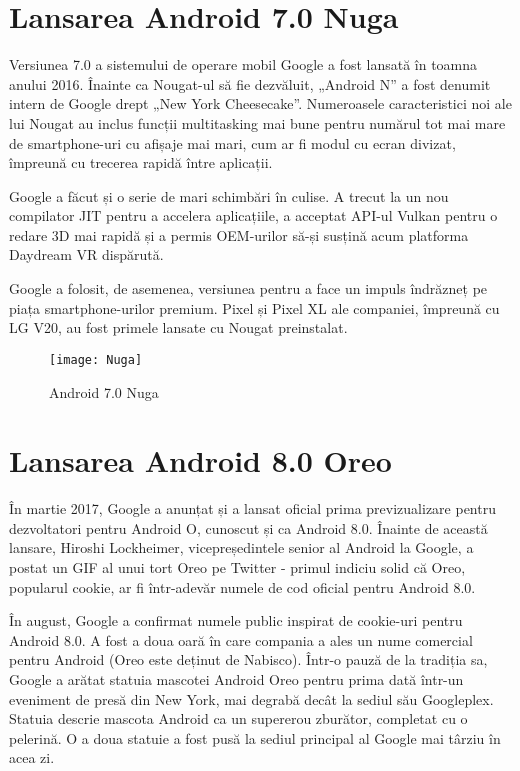 \documentclass[a4paper,12pt]{amsbook}
\begin{document}
\chapter{\Large Lansarea Android 7.0 Nuga}
\par
Versiunea 7.0 a sistemului de operare mobil Google a fost lansată în toamna anului 2016. Înainte ca Nougat-ul să fie dezvăluit, „Android N” a fost denumit intern de Google drept „New York Cheesecake”. Numeroasele caracteristici noi ale lui Nougat au inclus funcții multitasking mai bune pentru numărul tot mai mare de smartphone-uri cu afișaje mai mari, cum ar fi modul cu ecran divizat, împreună cu trecerea rapidă între aplicații.

Google a făcut și o serie de mari schimbări în culise. A trecut la un nou compilator JIT pentru a accelera aplicațiile, a acceptat API-ul Vulkan pentru o redare 3D mai rapidă și a permis OEM-urilor să-și susțină acum platforma Daydream VR dispărută.

Google a folosit, de asemenea, versiunea pentru a face un impuls îndrăzneț pe piața smartphone-urilor premium. Pixel și Pixel XL ale companiei, împreună cu LG V20, au fost primele lansate cu Nougat preinstalat.
\begin{figure}[h]
	\centering
	\texttt{[image: Nuga]}
	\caption[Nuga]{Android 7.0 Nuga}
	\label{fig:nuga}
\end{figure}
\par
\chapter{\Large Lansarea Android 8.0 Oreo}
\par
În martie 2017, Google a anunțat și a lansat oficial prima previzualizare pentru dezvoltatori pentru Android O, cunoscut și ca Android 8.0. Înainte de această lansare, Hiroshi Lockheimer, vicepreședintele senior al Android la Google, a postat un GIF al unui tort Oreo pe Twitter - primul indiciu solid că Oreo, popularul cookie, ar fi într-adevăr numele de cod oficial pentru Android 8.0.

În august, Google a confirmat numele public inspirat de cookie-uri pentru Android 8.0. A fost a doua oară în care compania a ales un nume comercial pentru Android (Oreo este deținut de Nabisco). Într-o pauză de la tradiția sa, Google a arătat statuia mascotei Android Oreo pentru prima dată într-un eveniment de presă din New York, mai degrabă decât la sediul său Googleplex. Statuia descrie mascota Android ca un supererou zburător, completat cu o pelerină. O a doua statuie a fost pusă la sediul principal al Google mai târziu în acea zi.
\end{document}
